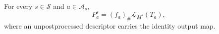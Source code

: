 For every \(s\in\mathcal S\) and \(a\in\mathcal A_s\),
\[
P_a^s=(f_a)_\#\mathcal L_{M^s}(T_a),
\]
where an unpostprocessed descriptor carries the identity output map.